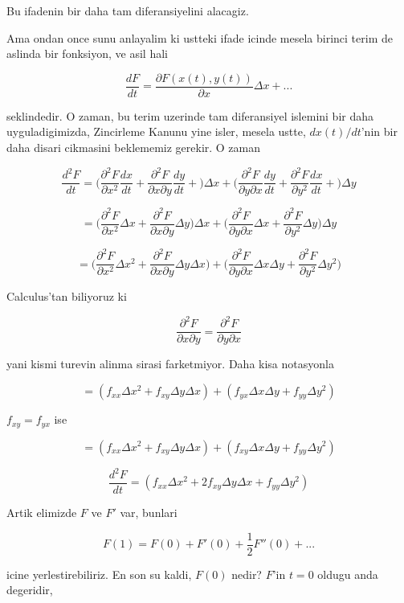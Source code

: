 \documentclass[12pt,fleqn]{article}
\begin{document}
Bu ifadenin bir daha tam diferansiyelini alacagiz. 

Ama ondan once sunu anlayalim ki ustteki ifade icinde mesela birinci terim
de aslinda bir fonksiyon, ve asil hali

\[ \frac{dF}{dt} = \frac{\partial F(x(t),y(t))}{\partial x}\Delta x + ...
 \]

seklindedir. O zaman, bu terim uzerinde tam diferansiyel islemini bir daha
uyguladigimizda, Zincirleme Kanunu yine isler, mesela ustte, $dx(t)/dt$'nin 
bir daha disari cikmasini beklememiz gerekir. O zaman 

\[ \frac{d^2F}{dt} =
\bigg(
\frac{\partial ^2 F}{\partial x^2}\frac{dx}{dt} + 
\frac{\partial ^2 F}{\partial x \partial y}\frac{dy}{dt} + 
\bigg) \Delta x +
\bigg(
\frac{\partial ^2 F}{\partial y \partial x}\frac{dy}{dt} + 
\frac{\partial ^2 F}{\partial y^2}\frac{dx}{dt} + 
\bigg) \Delta y 
\]

\[ =
\bigg(
\frac{\partial ^2 F}{\partial x^2}\Delta x + 
\frac{\partial ^2 F}{\partial x \partial y}\Delta y 
\bigg) \Delta x +
\bigg(
\frac{\partial ^2 F}{\partial y \partial x}\Delta x + 
\frac{\partial ^2 F}{\partial y^2}\Delta y 
\bigg) \Delta y 
 \]

\[ =
\bigg(
\frac{\partial ^2 F}{\partial x^2}\Delta x^2 + 
\frac{\partial ^2 F}{\partial x \partial y}\Delta y \Delta x
\bigg) +
\bigg(
\frac{\partial ^2 F}{\partial y \partial x}\Delta x \Delta y + 
\frac{\partial ^2 F}{\partial y^2}\Delta y^2
\bigg) 
 \]

Calculus'tan biliyoruz ki 

\[ 
\frac{\partial ^2 F}{\partial x \partial y} = 
\frac{\partial ^2 F}{\partial y \partial x} 
 \]

yani kismi turevin alinma sirasi farketmiyor. Daha kisa notasyonla

\[ =
(f_{xx}\Delta x^2 + f_{xy}\Delta y \Delta x ) +
(f_{yx}\Delta x \Delta y + f_{yy}\Delta y^2 )
 \]

$f_{xy} = f_{yx}$ ise

\[ =
(f_{xx}\Delta x^2 + f_{xy}\Delta y \Delta x ) +
(f_{xy}\Delta x \Delta y + f_{yy}\Delta y^2 )
 \]

\[
\frac{d^2F}{dt}  =
(f_{xx}\Delta x^2 + 2f_{xy}\Delta y \Delta x + f_{yy}\Delta y^2 )
 \]

Artik elimizde $F$ ve $F'$ var, bunlari 

\[ F(1) = F(0) + F'(0) + \frac{1}{2}F''(0) + ... \]

icine yerlestirebiliriz. En son su kaldi, $F(0)$ nedir? $F$'in $t=0$ oldugu
anda degeridir, 
\end{document}
